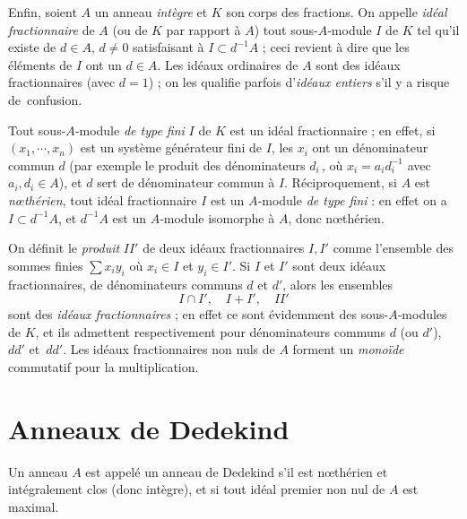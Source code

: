\documentclass[11pt, useosf,
  title in boldface,
  theorem in new line,
  theorem numbering = section,
  number theorems separately,
]{simplivre}
\begin{document}
    Enfin, soient \( A \) un anneau \emph{intègre} et \( K \) son corps des fractions. On appelle \emph{idéal fractionnaire} de \( A \) (ou de \( K \) par rapport à \( A \)) tout sous-\( A \)‑module \( I \) de \( K \) tel qu'il existe de \( d \in A \), \( d \neq 0 \) satisfaisant à \( I \subset d^{-1}A \) ; ceci revient à dire que les éléments de \( I \) ont un  \( d \in A \). Les idéaux ordinaires de \( A \) sont des idéaux fractionnaires (avec \( d = 1 \)) ; on les qualifie parfois d'\emph{idéaux entiers} s'il y a risque de~confusion.

    Tout sous-\( A \)‑module \emph{de type fini} \( I \) de \( K \) est un idéal fractionnaire ; en effet, si \( (x_1, \cdots, x_n) \) est un système générateur fini de \( I \), les \( x_i \) ont un dénominateur commun \( d \) (par exemple le produit des dénominateurs \( d_i \)\,, où \( x_i = a_i d_i^{-1} \) avec \( a_i, d_i \in A \)), et \( d \) sert de dénominateur commun à \( I \). Réciproquement, si \( A \) est \emph{nœthérien}, tout idéal fractionnaire \( I \) est un \( A \)‑module \emph{de type fini} : en effet on a \( I \subset d^{-1} A \), et \( d^{-1} A \) est un \( A \)‑module isomorphe à \( A \), donc nœthérien.

    On définit le \emph{produit} \( I I' \) de deux idéaux fractionnaires \( I, I' \) comme l'ensemble des sommes finies \( \sum x_i y_i \) où \( x_i \in I \) et \( y_i \in I' \). Si \( I \) et \( I' \) sont deux idéaux fractionnaires, de dénominateurs communs \( d \) et \( d' \), alors les ensembles
    \[
        I \cap I', \quad I+I', \quad I I'
    \]
    sont des \emph{idéaux fractionnaires} ; en effet ce sont évidemment des sous-\( A \)‑modules de \( K \), et ils admettent respectivement pour dénominateurs communs \( d \) (ou \( d' \)), \( d d' \) et~\( d d' \). Les idéaux fractionnaires non nuls de \( A \) forment un \emph{monoïde} commutatif pour la multiplication.

\section{Anneaux de Dedekind}\label{sec:anneaux de Dedekind}

    \begin{definition}
        Un anneau \( A \) est appelé un anneau de Dedekind s'il est nœthérien et intégralement clos (donc intègre), et si tout idéal premier non nul de \( A \) est maximal.
    \end{definition}
\end{document}
